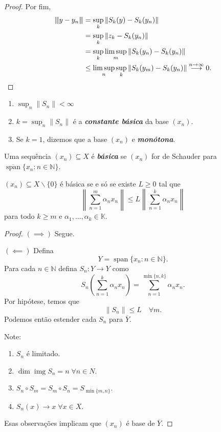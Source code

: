 \documentclass[portuguese]{article}
\theoremstyle{definition}
\newcommand{\N}{\mathbb{N}}
\DeclareMathOperator{\img}{img}
\newcommand{\vertiii}[1]{{\left\vert\kern-0.25ex\left\vert\kern-0.25ex\left\vert #1 
		\right\vert\kern-0.25ex\right\vert\kern-0.25ex\right\vert}}
\begin{document}
\begin{proof}
	Por fim,
	\begin{align*}
		\vertiii{y-y_n}&=\sup_k\|S_k(y)-S_k(y_n)\|\\
	&=\sup_k\|z_k-S_k(y_n)\|\\
	&=\sup_k\limsup_m\|S_k(y_n)-S_k(y_n)\|\\
	&\leq\limsup_n\sup_k\|S_k(y_m)-S_k(y_n)\|\overset{n\to\infty}{\longrightarrow}0.
	\end{align*}
\end{proof}
\begin{obs}\leavevmode
	\begin{enumerate}
		\item $\sup_n\|S_n\|<\infty$
		\item $k=\sup_n\|S_n\|$ é a \textbf{\textit{constante básica}} da base $(x_n)$.
		\item Se $k=1$, dizemos que a base $(x_n)$ e \textbf{\textit{monótona}}.		
	\end{enumerate}
\end{obs}
\begin{defn}
	Uma sequência $(x_n)\subseteq X$ é \textbf{\textit{básica}} se $(x_n)$ for de Schauder para $\overline{\operatorname{span}}\{x_n:n\in\N\}$.
\end{defn}
\begin{prop}
	$(x_n)\subseteq X\backslash\{0\}$ é básica se e só se existe $L\geq0$ tal que
	\[\left\|\sum_{n=1}^m\alpha_nx_n\right\|\leq L\left\|\sum_{n=1}^k\alpha_nx_n\right\|\]
	para todo $k\geq m$ e $\alpha_1,\ldots,\alpha_k\in\mathbb{K}$.
\end{prop}
\begin{proof}\leavevmode
	
	$(\implies)$ Segue.
	
	$(\impliedby)$ Defina
	\[Y=\operatorname{span}\{x_n:n\in\N\}.\]
	Para cada $n\in\N$ defina $S_n:Y\to Y$ como
	\[S_n\left(\sum_{n=1}^k\alpha_nx_n\right)=\sum^{\min\{n,k\}}_{n=1}\alpha_nx_n.\]
	Por hipótese, temos que
	\[\|S_n\|\leq L\quad\forall m.\]
	Podemos então estender cada $S_n$ para $\overline{Y}$.
	
	Note:
	\begin{enumerate}
		\item $S_n$ é limitado.
		\item $\dim\img S_n=n\;\forall n\in N$.
		\item $S_n\circ S_m=S_m\circ S_n=S_{\min\{m,n\}}$.
		\item $S_n(x)\to x\;\forall x\in X$.
	\end{enumerate}
	Esas observações {\color{orange}implicam} que $(x_n)$ é base de $\overline{Y}$.
\end{proof}
\end{document}
